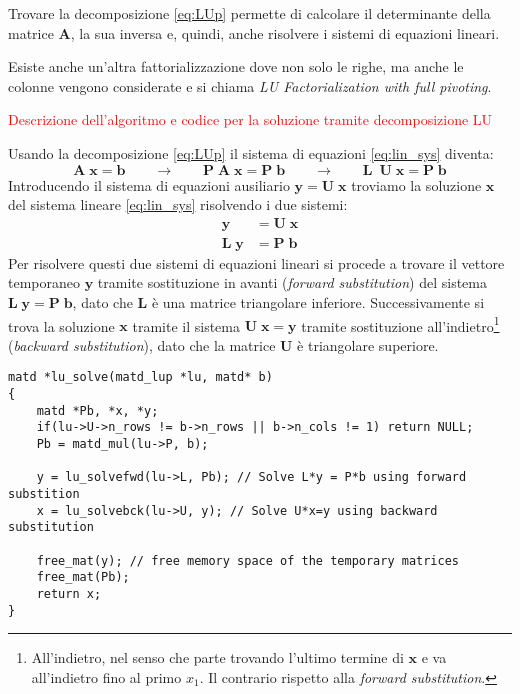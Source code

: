 \documentclass[10pt]{article}
\begin{document}
Trovare la decomposizione \eqref{eq:LUp} permette di calcolare il determinante della matrice $\mathbf{A}$, la sua inversa e, quindi, anche risolvere i sistemi di equazioni lineari.

Esiste anche un'altra fattorializzazione dove non solo le righe, ma anche le colonne vengono considerate e si chiama \emph{LU Factorialization with full pivoting}.

\textcolor{red}{Descrizione dell'algoritmo e codice per la soluzione tramite decomposizione LU}

Usando la decomposizione \eqref{eq:LUp} il sistema di equazioni \eqref{eq:lin_sys} diventa:
\begin{equation}
\mathbf{A} \; \mathbf{x} = \mathbf{b}
\qquad \rightarrow \qquad
\mathbf{P} \; \mathbf{A} \; \mathbf{x} = \mathbf{P} \; \mathbf{b}
\qquad \rightarrow \qquad
\mathbf{L}\ \; \mathbf{U} \; \mathbf{x} = \mathbf{P} \; \mathbf{b}
\end{equation}
Introducendo il sistema di equazioni ausiliario $\mathbf{y} = \mathbf{U} \; \mathbf{x}$ troviamo la soluzione $\mathbf{x}$ del sistema lineare \eqref{eq:lin_sys} risolvendo i due sistemi:
\begin{align}
\mathbf{y} & = \mathbf{U} \; \mathbf{x} \\
\mathbf{L} \; \mathbf{y} & = \mathbf{P} \; \mathbf{b}
\end{align}
Per risolvere questi due sistemi di equazioni lineari si procede a trovare il vettore temporaneo $\mathbf{y}$ tramite sostituzione in avanti (\textit{forward substitution}) del sistema $\mathbf{L} \; \mathbf{y} = \mathbf{P} \; \mathbf{b}$, dato che $\mathbf{L}$ è una matrice triangolare inferiore. Successivamente si trova la soluzione $\mathbf{x}$ tramite il sistema $\mathbf{U} \; \mathbf{x} = \mathbf{y}$ tramite sostituzione all'indietro\footnote{All'indietro, nel senso che parte trovando l'ultimo termine di $\mathbf{x}$ e va all'indietro fino al primo $x_1$. Il contrario rispetto alla \textit{forward substitution}.} (\textit{backward substitution}), dato che la matrice $\mathbf{U}$ è triangolare superiore.

\begin{lstlisting}
matd *lu_solve(matd_lup *lu, matd* b)
{
	matd *Pb, *x, *y;
	if(lu->U->n_rows != b->n_rows || b->n_cols != 1) return NULL;
	Pb = matd_mul(lu->P, b);
	
	y = lu_solvefwd(lu->L, Pb); // Solve L*y = P*b using forward substition
	x = lu_solvebck(lu->U, y); // Solve U*x=y using backward substitution
	
	free_mat(y); // free memory space of the temporary matrices	
	free_mat(Pb);
	return x;
}
\end{lstlisting}
\end{document}
